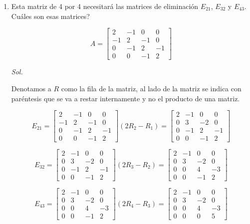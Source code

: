 \begin{enumerate}
	\item Esta matriz de 4 por 4 necesitará las matrices de eliminación $E_{21}$, $E_{32}$ y $E_{43}$. Cuáles son esas matrices?

	      \begin{equation}
		      A= \begin{bmatrix}2 &-1 &0& 0\\ -1 &2 &-1 &0 \\0&-1& 2&-1 \\ 0& 0 &-1& 2 \end{bmatrix}
	      \end{equation}

	      \textit{ Sol. }

	      Denotamos a $R$ como la fila de la matriz, al lado de la matriz se indica con  paréntesis que se va a restar internamente y no el producto de una matriz.

	      \begin{equation*}
		      E_{21}=\begin{bmatrix}
			      2 & -1 & 0 & 0 \\ -1 &2 &-1 &0 \\0&-1& 2&-1 \\ 0& 0 &-1& 2
		      \end{bmatrix} (2R_2 -R_{1})= \begin{bmatrix}
			      2 & -1 & 0 & 0 \\ 0 &3 &-2 &0 \\0&-1& 2&-1 \\ 0& 0 &-1& 2
		      \end{bmatrix}
	      \end{equation*}

	      \begin{equation*}
		      E_{32}=\begin{bmatrix}
			      2 & -1 & 0 & 0 \\ 0 &3 &-2 &0 \\0&-1& 2&-1 \\ 0& 0 &-1& 2
		      \end{bmatrix} (2R_{3}-R_2 )= \begin{bmatrix}
			      2 & -1 & 0 & 0 \\ 0 &3 &-2 &0 \\0&0& 4&-3 \\ 0& 0 &-1& 2
		      \end{bmatrix}
	      \end{equation*}

	      \begin{equation*}
		      E_{43}=\begin{bmatrix}
			      2 & -1 & 0 & 0 \\ 0 &3 &-2 &0 \\0&0& 4&-3 \\ 0& 0 &-1& 2
		      \end{bmatrix} (2R_{4}-R_{3})= \begin{bmatrix}
			      2 & -1 & 0 & 0 \\ 0 &3 &-2 &0 \\0&0& 4&-3 \\ 0& 0 &0& 5
		      \end{bmatrix}
	      \end{equation*}


\end{enumerate}
